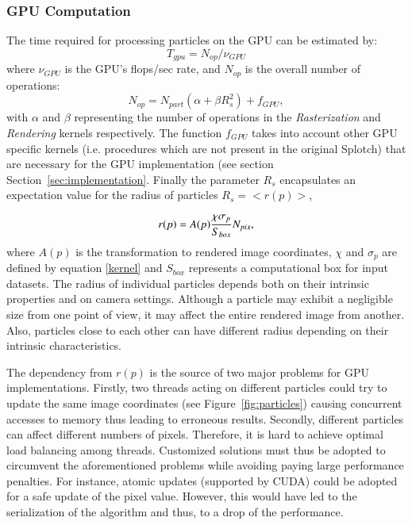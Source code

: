 \documentclass[1p]{elsarticle}
\begin{document}
\subsubsection{GPU Computation}
The time required for processing particles on the GPU can be estimated by:
\begin{equation}
T_{gpu} = N_{op}/\nu_{GPU}
\end{equation}
where $\nu_{GPU}$ is the GPU's flops/sec rate, and $N_{op}$ is the overall number of operations:
\begin{equation}\label{ops}
N_{op} = N_{part}(\alpha + \beta R_s^2) + f_{GPU},
\end{equation}
with $\alpha$ and $\beta$ representing the number of operations in the \textit{Rasterization} and \textit{Rendering} kernels respectively. The function 
$f_{GPU}$ takes into account other GPU specific kernels (i.e. procedures
which are not present in the original Splotch) that are necessary for the GPU implementation
(see section Section~\ref{sec:implementation}.
Finally the parameter $R_s$ encapsulates an expectation value for the radius of particles $R_s = <r(p)>$,

\begin{equation}\label{radius}
r(p) = A(p){\chi \sigma_p\over S_{box}} N_{pix},
\end{equation} 
where $A(p)$ is the transformation to rendered image coordinates, $\chi$ and $\sigma_p$ are defined by equation \eqref{kernel} and $S_{box}$ represents a computational box for input datasets. 
The radius of individual particles depends both on their intrinsic properties and on camera settings. Although a particle may exhibit a negligible size from one point of view, it may affect the entire rendered image from another. Also, particles close to each other can have different radius depending on their intrinsic characteristics.

The dependency from $r(p)$ is the source of two major problems for GPU implementations. Firstly, two threads acting on different particles could try 
to update the same image coordinates (see Figure~\ref{fig:particles}) causing concurrent accesses to memory thus leading to erroneous results. 
Secondly, different particles can affect different numbers of pixels. Therefore, it is hard to achieve optimal load balancing among threads.  
Customized solutions must thus be adopted to circumvent the aforementioned problems while avoiding paying large performance penalties. For instance, atomic updates (supported by CUDA) could be adopted for a safe update of the pixel value. However, this would have led to the serialization of the algorithm and thus, to a drop of the performance. 
\end{document}
